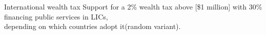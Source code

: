\documentclass[aspectratio=169,xcolor=dvipsnames, 11pt,mathserif]{beamer}
\begin{document}
\begin{frame}{International wealth tax}
\centering Support for a 2\% wealth tax above [\$1 million] with 30\% financing public services in LICs,\\depending on which countries adopt it(random variant).
\end{frame}
\end{document}
